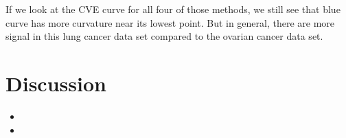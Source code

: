 \documentclass{article}\usepackage[]{graphicx}\usepackage[]{color}
\begin{document}
If we look at the CVE curve for all four of those methods, we still see that blue curve has more curvature near its lowest point. But in general, there are more signal in this lung cancer data set compared to the ovarian cancer data set.

\section{Discussion}
	\begin{itemize}
		\item 	
		\item
	\end{itemize}




\end{document}
